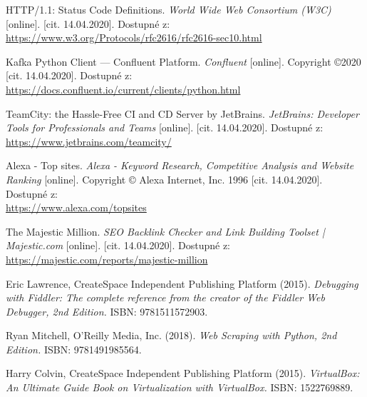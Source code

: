 \documentclass[thesis=M,czech,hidelinks]{FITthesis}[2013/05/06]
\begin{document}
\begin{thebibliography}{9}
	HTTP/1.1: Status Code Definitions. \textit{World Wide Web Consortium (W3C)} [online]. [cit. 14.04.2020]. Dostupné z: \\ 
	\url{https://www.w3.org/Protocols/rfc2616/rfc2616-sec10.html}
	
	Kafka Python Client — Confluent Platform. \textit{Confluent} [online]. Copyright ©2020 [cit. 14.04.2020]. Dostupné z:  \\ 
	\url{https://docs.confluent.io/current/clients/python.html}
	
	TeamCity: the Hassle-Free CI and CD Server by JetBrains. \textit{JetBrains: Developer Tools for Professionals and Teams} [online]. [cit. 14.04.2020]. Dostupné z: \\ 
	\url{https://www.jetbrains.com/teamcity/}
	
	Alexa - Top sites. \textit{Alexa - Keyword Research, Competitive Analysis and Website Ranking} [online]. Copyright © Alexa Internet, Inc. 1996 [cit. 14.04.2020]. Dostupné z:  \\ 
	\url{https://www.alexa.com/topsites}
	
	The Majestic Million. \textit{SEO Backlink Checker and Link Building Toolset | Majestic.com} [online]. [cit. 14.04.2020]. Dostupné z:  \\ 
	\url{https://majestic.com/reports/majestic-million}
	
	Eric Lawrence, CreateSpace Independent Publishing Platform (2015).\textit{ Debugging with
	Fiddler: The complete reference from the creator of the Fiddler Web Debugger, 2nd
	Edition.} ISBN: 9781511572903.
	
	Ryan Mitchell, O'Reilly Media, Inc. (2018). \textit{Web Scraping with Python, 2nd Edition.}
	ISBN: 9781491985564.
	
	Harry Colvin, CreateSpace Independent Publishing Platform (2015). \textit{VirtualBox: An
	Ultimate Guide Book on Virtualization with VirtualBox.} ISBN: 1522769889.
		
\end{thebibliography}

\appendix

\end{document}
